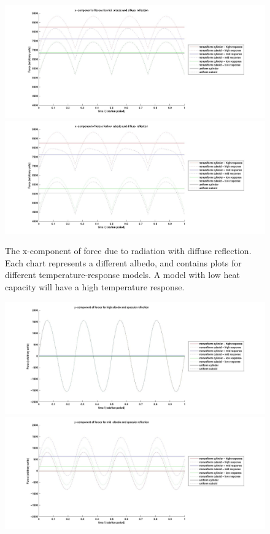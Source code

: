 \begin{description}
\begin{figure}
       \includegraphics[width=160mm]{figs/Plate_mod/Fx_ref_dif_alb_mid_.jpg}
       \includegraphics[width=160mm]{figs/Plate_mod/Fx_ref_dif_alb_low_.jpg}
       \caption{The x-component of force due to radiation with diffuse
       reflection.  Each chart represents a different albedo, and contains
       plots for different temperature-response models.  A model with low
       heat capacity will have a high temperature response.}
       \label{fig:ivv_platemod_fig2}
     \end{figure}
     \begin{figure}
       \includegraphics[width=160mm]{figs/Plate_mod/Fy_ref_spc_alb_high.jpg}
       \includegraphics[width=160mm]{figs/Plate_mod/Fy_ref_spc_alb_mid_.jpg}

\end{figure}
\end{description}
